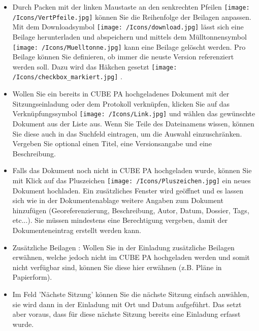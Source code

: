 
\begin{itemize}
\item 
Durch Packen mit der linken Maustaste an den senkrechten Pfeilen \texttt{[image: /Icons/VertPfeile.jpg]}  können Sie die Reihenfolge der Beilagen anpassen. Mit dem Downloadsymbol \texttt{[image: /Icons/download.jpg]}  lässt sich eine Beilage herunterladen und abspeichern und mittels dem Mülltonnensymbol \texttt{[image: /Icons/Muelltonne.jpg]}  kann eine Beilage gelöscht werden. Pro Beilage können Sie definieren, ob immer die neuste Version referenziert werden soll. Dazu wird das Häkchen gesetzt \texttt{[image: /Icons/checkbox\_markiert.jpg]} .
\item 
Wollen Sie ein bereits in CUBE PA hochgeladenes Dokument mit der Sitzungseinladung oder dem Protokoll verknüpfen, klicken Sie auf das Verknüpfungssymbol \texttt{[image: /Icons/Link.jpg]}  und wählen das gewünschte Dokument aus der Liste aus. Wenn Sie Teile des Dateinamens wissen, können Sie diese auch in das Suchfeld eintragen, um die Auswahl einzuschränken. Vergeben Sie optional einen Titel, eine Versionsangabe und eine Beschreibung.
\item 
Falls das Dokument noch nicht in CUBE PA hochgeladen wurde, können Sie mit Klick auf das Pluszeichen \texttt{[image: /Icons/Pluszeichen.jpg]}  ein neues Dokument hochladen. Ein zusätzliches Fenster wird geöffnet und es lassen sich wie in der Dokumentenablage weitere Angaben zum Dokument hinzufügen (Georeferenzierung, Beschreibung, Autor, Datum, Dossier, Tags, etc...). Sie müssen mindestens eine Berechtigung vergeben, damit der Dokumenteneintrag erstellt werden kann.
\end{itemize}

\begin{itemize}
\item 
Zusätzliche Beilagen : Wollen Sie in der Einladung zusätzliche Beilagen erwähnen, welche jedoch nicht im CUBE PA hochgeladen werden und somit nicht verfügbar sind, können Sie diese hier erwähnen (z.B. Pläne in Papierform).
\item 
Im Feld 'Nächste Sitzung' können Sie die nächste Sitzung einfach anwählen, sie wird dann in der Einladung mit Ort und Datum aufgeführt. Das setzt aber voraus, dass für diese nächste Sitzung bereits eine Einladung erfasst wurde.
\end{itemize}

